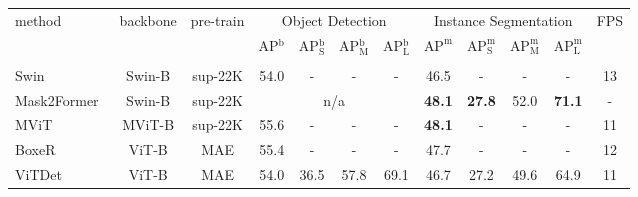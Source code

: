     
    \begin{table}[t]
    \centering
    \footnotesize
    {
    {
    \begin{tabular}{lccccccccccc}
    \multicolumn{1}{l|}{\multirow{2}{*}{method}} & \multicolumn{1}{c}{\multirow{2}{*}{backbone}} & \multicolumn{1}{c|}{\multirow{2}{*}{pre-train}} & \multicolumn{4}{c|}{Object Detection} & \multicolumn{4}{c|}{Instance Segmentation} & \multirow{2}{*}{FPS} \\
    \multicolumn{1}{l|}{} & \multicolumn{1}{c}{} & \multicolumn{1}{c|}{} & AP$^\text{b}$ & AP$^\text{b}_\text{S}$ & AP$^\text{b}_\text{M}$ & \multicolumn{1}{c|}{AP$^\text{b}_\text{L}$} & $\text{AP}^\text{m}$ & $\text{AP}^\text{m}_\text{S}$ & $\text{AP}^\text{m}_\text{M}$ & \multicolumn{1}{c|}{$\text{AP}^\text{m}_\text{L}$} &  \\
    \shline
    \rowcolor{orange!30} \multicolumn{12}{l}{\footnotesize \textbf{Base models}} \\
    \multicolumn{1}{l|}{{\color{mygray} Swin~\cite{liu2021swintransformer}}} & {\color{mygray} Swin-B} & \multicolumn{1}{c|}{\color{mygray} sup-22K} & {\color{mygray} 54.0} & {\color{mygray} -} & {\color{mygray} -} & \multicolumn{1}{c|}{{\color{mygray} -}} & {\color{mygray} 46.5} & {\color{mygray} -} & {\color{mygray} -} & \multicolumn{1}{c|}{{\color{mygray} -}} & {\color{mygray} 13} \\
    \multicolumn{1}{l|}{Mask2Former~\cite{cheng2022mask2former}} & {Swin-B} & \multicolumn{1}{c|}{sup-22K} & \multicolumn{4}{c|}{\small n/a} & \textbf{48.1} & \textbf{27.8} & 52.0 & \multicolumn{1}{c|}{\textbf{71.1}} & {\small -} \\
    \multicolumn{1}{l|}{{\color{mygray} MViT~\cite{fan2021mvit}}} & {\color{mygray} MViT-B} & \multicolumn{1}{c|}{\color{mygray} sup-22K} & {\color{mygray} 55.6} & {\color{mygray} -} & {\color{mygray} -} & \multicolumn{1}{c|}{{\color{mygray} -}} & {\color{mygray} \textbf{48.1}} & {\color{mygray} -} & {\color{mygray} -} & \multicolumn{1}{c|}{{\color{mygray} -}} & {\color{mygray} 11} \\
    \multicolumn{1}{l|}{BoxeR~\cite{nguyen2022boxer}} & ViT-B & \multicolumn{1}{c|}{MAE} & 55.4 & - & - & \multicolumn{1}{c|}{-} & 47.7 & - & - & \multicolumn{1}{c|}{-} & 12 \\
    \multicolumn{1}{l|}{{\color{mygray} ViTDet~\cite{li2022vitdet}}} & {\color{mygray} ViT-B} & \multicolumn{1}{c|}{\color{mygray} MAE} & {\color{mygray} 54.0} & {\color{mygray} 36.5} & {\color{mygray} 57.8} & \multicolumn{1}{c|}{{\color{mygray} 69.1}} & {\color{mygray} 46.7} & {\color{mygray} 27.2} & {\color{mygray} 49.6} & \multicolumn{1}{c|}{{\color{mygray} 64.9}} & {\color{mygray} 11} \\

\end{tabular}}}
\end{table}
